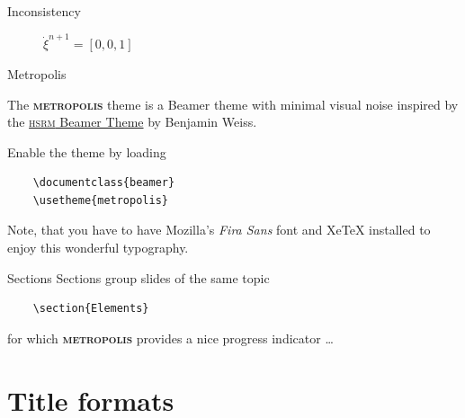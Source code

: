 \documentclass[10pt]{beamer}
\newcommand{\themename}{\textbf{\textsc{metropolis}}\xspace}
\begin{document}
\begin{frame}{Inconsistency}
     \begin{figure}
	\begin{center}
	\resizebox{4cm}{!}
    {
		}
	\end{center}
	\caption{$\dot{\xi}^{n+1}=[0,0,1]$}
\end{figure}
\end{frame}
\begin{frame}[fragile]{Metropolis}

  The \themename theme is a Beamer theme with minimal visual noise
  inspired by the \href{https://github.com/hsrmbeamertheme/hsrmbeamertheme}{\textsc{hsrm} Beamer
  Theme} by Benjamin Weiss.

  Enable the theme by loading

  \begin{verbatim}    \documentclass{beamer}
    \usetheme{metropolis}\end{verbatim}

  Note, that you have to have Mozilla's \emph{Fira Sans} font and XeTeX
  installed to enjoy this wonderful typography.
\end{frame}
\begin{frame}[fragile]{Sections}
  Sections group slides of the same topic

  \begin{verbatim}    \section{Elements}\end{verbatim}

  for which \themename provides a nice progress indicator \ldots
\end{frame}

\section{Title formats}
\end{document}
